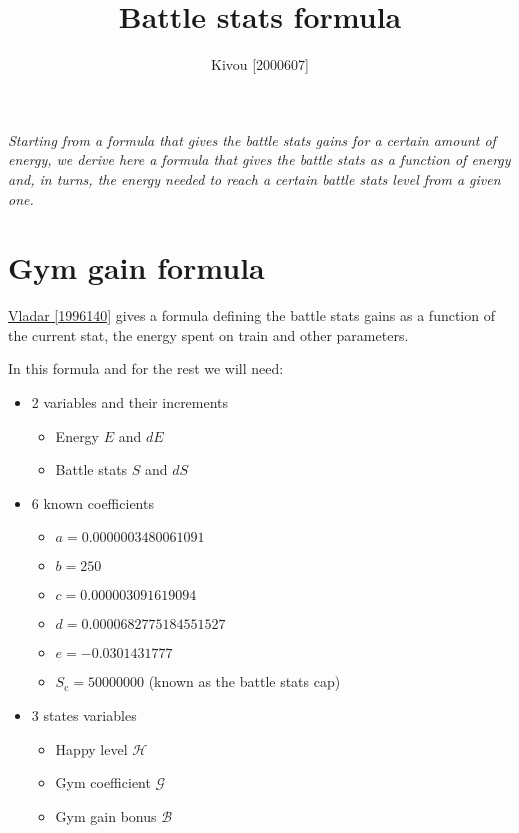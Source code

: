 \documentclass[12pt]{article}
\title{Battle stats formula}
\author{Kivou [2000607]}
\def\happy{\mathcal{H}}
\def\gym{\mathcal{G}}
\def\bonus{\mathcal{B}}
\def\Sc{S_\text{c}}
\begin{document}
\maketitle
\par {\it Starting from a formula that gives the battle stats gains for a certain amount of energy, we derive here  a formula that gives the battle stats as a function of energy and, in turns, the energy needed to reach a certain battle stats level from a given one.}

\section{Gym gain formula}
\href{https://www.torn.com/forums.php?p=threads&f=61&t=16003284&b=0&a=0&start=0&to=17684755}{Vladar [1996140]} gives a formula defining the battle stats gains as a function of the current stat, the energy spent on train and other parameters.

\par In this formula and for the rest we will need:
\begin{itemize}
    \item 2 variables and their increments
    \begin{itemize}
        \item Energy $E$ and $dE$
        \item Battle stats $S$ and $dS$
    \end{itemize}
    \item 6 known coefficients
        \begin{itemize}
            \item $a = 0.0000003480061091$
            \item $b = 250$
            \item $c = 0.000003091619094$
            \item $d = 0.0000682775184551527$
            \item $e = -0.0301431777$
            \item $\Sc = 50000000$ (known as the battle stats cap)
        \end{itemize}
    \item 3 states variables
    \begin{itemize}
        \item Happy level $\happy$
        \item Gym coefficient $\gym$
        \item Gym gain bonus $\bonus$
    \end{itemize}
\end{itemize}
\end{document}
